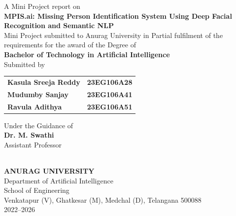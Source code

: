\documentclass[12pt,a4paper]{report}
\begin{document}
\begin{titlepage}
    \centering
    \vspace*{0.2in}
    {\large A Mini Project report on}\\[0.4in]
    
    {\bfseries\Large MPIS.ai: Missing Person Identification System Using Deep Facial Recognition and Semantic NLP}\\[0.4in]
    
    {\normalsize Mini Project submitted to Anurag University in Partial fulfilment of the requirements for the award of the Degree of}\\[0.15in]
    {\bfseries\large Bachelor of Technology in Artificial Intelligence}\\[0.4in]
    
    {\large Submitted by}\\[0.2in]
    \begin{table}[H]
        \centering
        \begin{tabular}{ll}
            \textbf{Kasula Sreeja Reddy} & \textbf{23EG106A28} \\
            \textbf{Mudumby Sanjay}      & \textbf{23EG106A41} \\
            \textbf{Ravula Adithya}      & \textbf{23EG106A51} \\
        \end{tabular}
    \end{table}
    \vspace{0.2in}
    
    {\large Under the Guidance of}\\[0.15in]
    \textbf{\large Dr. M. Swathi}\\[0.05in]
    {\normalsize Assistant Professor}\\[0.4in]
    
    \begin{center}
        \\[0.1in]
        {\bfseries\Large ANURAG UNIVERSITY}\\[0.05in]
        {\normalsize Department of Artificial Intelligence}\\
        {\normalsize School of Engineering}\\
        {\normalsize Venkatapur (V), Ghatkesar (M), Medchal (D), Telangana 500088}\\
        {\normalsize 2022--2026}
    \end{center}
\end{titlepage}
\end{document}
